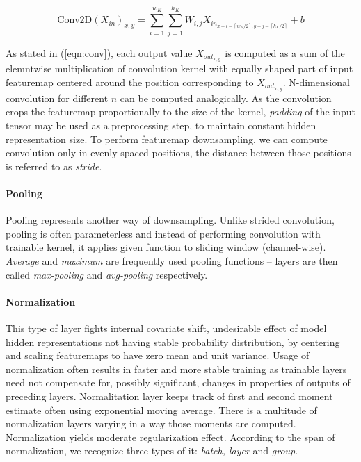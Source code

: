 \begin{equation} \label{eqn:conv}
\text{Conv2D}(X_{in})_{x, y} =
    \sum\limits_{i=1}^{w_K}
    \sum\limits_{j=1}^{h_K}
    W_{i,j} X_{in_{x + i - \left\lceil w_K / 2 \right\rceil, y + j - \left\lceil h_K / 2 \right\rceil}} + b
\end{equation}

As stated in (\ref{eqn:conv}), each output value $X_{out_{x, y}}$ is computed as a sum of the elemntwise multiplication of convolution kernel with equally shaped part of input featuremap centered around the position corresponding to $X_{out_{x, y}}$. N-dimensional convolution for different $n$ can be computed analogically. As the convolution crops the featuremap proportionally to the size of the kernel, \emph{padding} of the input tensor may be used as a preprocessing step, to maintain constant hidden representation size. To perform featuremap downsampling, we can compute convolution only in evenly spaced positions, the distance between those positions is referred to as \emph{stride}.

\paragraph{Pooling}
Pooling represents another way of downsampling. Unlike strided convolution, pooling is often parameterless and instead of performing convolution with trainable kernel, it applies given function to sliding window (channel-wise). \emph{Average} and \emph{maximum} are frequently used pooling functions -- layers are then called \emph{max-pooling} and \emph{avg-pooling} respectively.

\paragraph{Normalization}
This type of layer fights internal covariate shift, undesirable effect of model hidden representations not having stable probability distribution, by centering and scaling featuremaps to have zero mean and unit variance. Usage of normalization often results in faster and more stable training as trainable layers need not compensate for, possibly significant, changes in properties of outputs of preceding layers. Normalitation layer keeps track of first and second moment estimate often using exponential moving average. There is a multitude of normalization layers varying in a way those moments are computed. Normalization yields moderate regularization effect. According to the span of normalization, we recognize three types of it: \emph{batch, layer} and \emph{group}.

